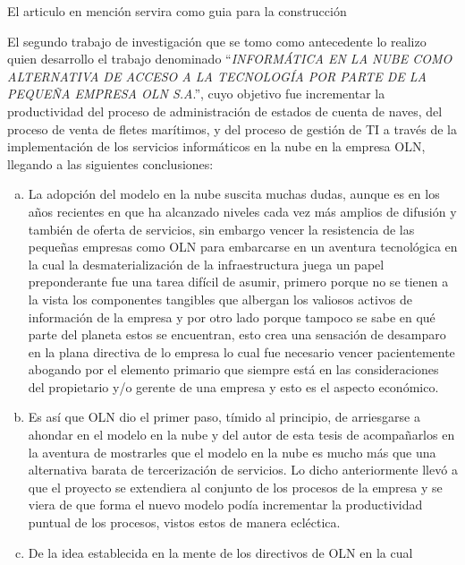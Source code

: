 El articulo en menci\'on servira como guia para la construcci\'on

El segundo trabajo de investigaci\'on que se tomo como antecedente lo realizo
\citep{jcampos} quien desarrollo el trabajo denominado ``\emph{INFORM\'ATICA EN LA NUBE
COMO ALTERNATIVA DE ACCESO A LA TECNOLOG\'IA POR PARTE DE LA PEQUE\~NA EMPRESA
OLN S.A}.'', cuyo objetivo fue incrementar la productividad del proceso de
administraci\'on de estados de cuenta de naves, del proceso de venta de fletes
mar\'itimos, y del proceso de gesti\'on de TI a trav\'es de la implementaci\'on
de los servicios inform\'aticos en la nube en la empresa OLN, llegando a las
siguientes conclusiones:
\begin{enumerate}[a.]
    \item La adopci\'on del modelo en la nube suscita muchas dudas, aunque es en
          los a\~nos recientes en que ha alcanzado niveles cada vez m\'as amplios
          de difusi\'on y tambi\'en de oferta de servicios, sin embargo vencer la
          resistencia de las peque\~nas empresas como OLN para embarcarse en un
          aventura tecnol\'ogica en la cual la desmaterializaci\'on de la
          infraestructura juega un papel preponderante fue una tarea dif\'icil
          de asumir, primero porque no se tienen a la vista los componentes
          tangibles que albergan los valiosos activos de informaci\'on de la
          empresa y por otro lado porque tampoco se sabe en qu\'e parte del
          planeta estos se encuentran, esto crea una sensaci\'on de desamparo en
          la plana directiva de lo empresa lo cual fue necesario vencer
          pacientemente abogando por el elemento primario que siempre est\'a en
          las consideraciones del propietario y/o gerente de una empresa y esto
          es el aspecto econ\'omico.
    \item Es as\'i que OLN dio el primer paso, t\'imido al principio, de arriesgarse
          a ahondar en el modelo en la nube y del autor de esta tesis de acompa\~narlos
          en la aventura de mostrarles que el modelo en la nube es mucho m\'as
          que una alternativa barata de tercerizaci\'on de servicios. Lo dicho
          anteriormente llev\'o a que el proyecto se extendiera al conjunto de
          los procesos de la empresa y se viera de que forma el nuevo modelo
          pod\'ia incrementar la productividad puntual de los procesos, vistos
          estos de manera ecl\'ectica.
    \item De la idea establecida en la mente de los directivos de OLN en la cual

\end{enumerate}
